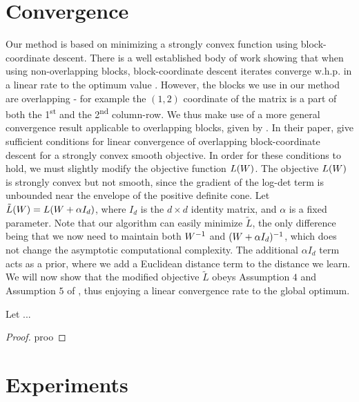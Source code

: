 \documentclass{article}
\begin{document}
\section{Convergence}
Our method is based on minimizing a strongly convex function using block-coordinate descent. There is a well established body of work showing that when using non-overlapping blocks, block-coordinate descent iterates converge w.h.p. in a linear rate to the optimum value \cite{nesterov2012efficiency,richtarik2014iteration}. However, the blocks we use in our method are overlapping - for example the $(1,2)$ coordinate of the matrix is a part of both the 1\textsuperscript{st} and the 2\textsuperscript{nd} column-row. We thus make use of a more general convergence result applicable to overlapping blocks, given by \citet{richtarik2013optimal}. In their paper, \citet{richtarik2013optimal} give sufficient conditions for linear convergence of overlapping block-coordinate descent for a strongly convex smooth objective. In order for these conditions to hold, we must slightly modify the objective function $L({{W}})$. The objective $L({W})$ is strongly convex but not smooth, since the gradient of the log-det term is unbounded near the envelope of the positive definite cone. Let $\tilde{L}({{W}}) = L({{W} + \alpha I_d})$, where $I_d$ is the $d \times d$ identity matrix, and $\alpha$ is a fixed parameter. Note that our algorithm can easily minimize $\tilde{L}$, the only difference being that we now need to maintain both ${W}^{-1}$ and $({W}+\alpha I_d)^{-1}$, which does not change the asymptotic computational complexity. The additional $\alpha I_d$ term acts as a prior, where we add a Euclidean distance term to the distance we learn. 
We will now show that the modified objective $\tilde{L}$ obeys Assumption $4$ and Assumption $5$ of \citet{richtarik2013optimal}, thus enjoying a linear convergence rate to the global optimum.

\begin{theorem}
Let ...
\end{theorem}

\begin{proof}
proo
\end{proof}
\section{Experiments}
\end{document}
